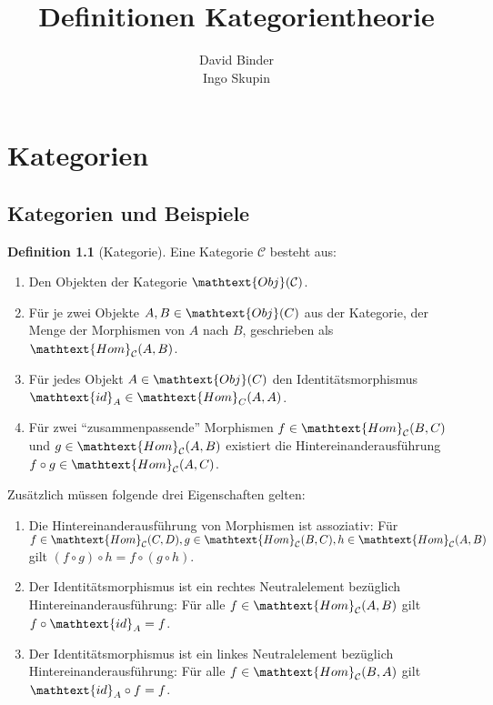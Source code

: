 \documentclass[10pt,twoside,openright]{memoir}
\author{David Binder\\ Ingo Skupin}
\title{Definitionen Kategorientheorie}
\date{}
\makeatletter
\theoremstyle{definition}
\newtheorem{definition}{Definition}
\def\maketitle{%
  \null
  \thispagestyle{empty}%
  \vfill
  \begin{center}\leavevmode
    \normalfont
    {\LARGE\raggedleft \@author\par}%
    \hrulefill\par
    {\huge\raggedright \@title\par}%
    \vskip 1cm
  \end{center}%
  \vfill
  \null
  \cleardoublepage
  }
\newcommand{\C}{\ensuremath{\mathcal{C}}}
\newcommand{\Obj}[1]{\ensuremath{\mathtext{Obj}(#1)}}
\newcommand{\Hom}[3]{\ensuremath{\mathtext{Hom}_{#1}(#2, #3)}}
\newcommand{\id}[1]{\ensuremath{\mathtext{id}_{#1}}}
\makeatother
\begin{document}
\let\cleardoublepage\clearpage

\maketitle

\frontmatter

\tableofcontents

\mainmatter

\chapter{Kategorien}

\section{Kategorien und Beispiele}

\begin{definition}[Kategorie]
  Eine Kategorie $\C$ besteht aus:
  \begin{enumerate}
  \item Den Objekten der Kategorie $\Obj{\C}$.
  \item Für je zwei Objekte $A, B \in \Obj{C}$ aus der Kategorie, der Menge der Morphismen von $A$ nach $B$, geschrieben als $\Hom{\C}{A}{B}$.
  \item Für jedes Objekt $A \in \Obj{C}$ den Identitätsmorphismus $\id{A} \in \Hom{C}{A}{A}$.
  \item Für zwei \enquote{zusammenpassende} Morphismen $f \in \Hom{\C}{B}{C}$ und $g \in \Hom{\C}{A}{B}$ existiert die Hintereinanderausführung $f \circ g \in \Hom{\C}{A}{C}$.
  \end{enumerate}
  Zusätzlich müssen folgende drei Eigenschaften gelten:
  \begin{enumerate}
  \item Die Hintereinanderausführung von Morphismen ist assoziativ: Für $f \in \Hom{\C}{C}{D}, g \in \Hom{\C}{B}{C}, h \in \Hom{\C}{A}{B}$ gilt $(f \circ g) \circ h = f \circ (g \circ h)$.
  \item Der Identitätsmorphismus ist ein rechtes Neutralelement bezüglich Hintereinanderausführung: Für alle $f \in \Hom{\C}{A}{B}$ gilt $f \circ \id{A} = f$.
  \item Der Identitätsmorphismus ist ein linkes Neutralelement bezüglich Hintereinanderausführung: Für alle $f \in \Hom{\C}{B}{A}$ gilt $\id{A} \circ f = f$.
  \end{enumerate}
\end{definition}
\end{document}

